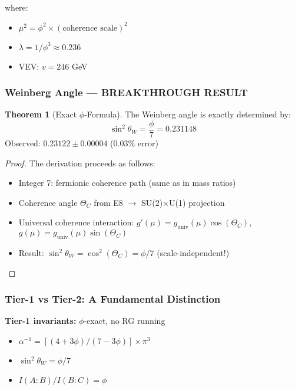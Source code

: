 \documentclass[11pt]{article}
\theoremstyle{definition}
\newtheorem{theorem}{Theorem}[section]
\newcommand{\goldenratio}{\phi}
\begin{document}
where:
\begin{itemize}
\item $\mu^2 = \goldenratio^2 \times (\text{coherence scale})^2$
\item $\lambda = 1/\goldenratio^3 \approx 0.236$
\item VEV: $v = 246$ GeV
\end{itemize}

\subsubsection{Weinberg Angle — BREAKTHROUGH RESULT}

\begin{theorem}[Exact $\goldenratio$-Formula]
The Weinberg angle is exactly determined by:
\begin{equation}
\sin^2\theta_W = \frac{\goldenratio}{7} = 0.231148
\end{equation}
Observed: $0.23122 \pm 0.00004$ (0.03\% error)
\end{theorem}

\begin{proof}
The derivation proceeds as follows:
\begin{itemize}
\item Integer 7: fermionic coherence path (same as in mass ratios)
\item Coherence angle $\Theta_C$ from E8 $\to$ SU(2)$\times$U(1) projection
\item Universal coherence interaction: $g'(\mu) = g_{\text{univ}}(\mu)\cos(\Theta_C)$, $g(\mu) = g_{\text{univ}}(\mu)\sin(\Theta_C)$
\item Result: $\sin^2\theta_W = \cos^2(\Theta_C) = \goldenratio/7$ (scale-independent!)
\end{itemize}
\end{proof}

\subsubsection{Tier-1 vs Tier-2: A Fundamental Distinction}

\textbf{Tier-1 invariants:} $\goldenratio$-exact, no RG running
\begin{itemize}
\item $\alpha^{-1} = [(4+3\goldenratio)/(7-3\goldenratio)]\times\pi^3$
\item $\sin^2\theta_W = \goldenratio/7$
\item $I(A:B)/I(B:C) = \goldenratio$
\end{itemize}
\end{document}
